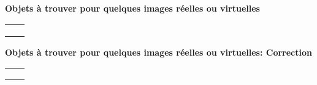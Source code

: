 \documentclass{article}
\newcommand{\titre}[1]{
\begin{center}
  {\Large\textbf{#1}}
\end{center}

}
\begin{document}
\titre{Objets \`a trouver pour quelques images r\'eelles ou virtuelles}
\begin{tabular}{|c|c|}
\hline
&\\ \hline
&\\ \hline
&\\ \hline
&\\ \hline
\end{tabular}


\newpage


\titre{Objets \`a trouver pour quelques images r\'eelles ou virtuelles: Correction}
\begin{tabular}{|c|c|}
\hline
&\\ \hline
&\\ \hline
&\\ \hline
&\\ \hline
\end{tabular}


\newpage
\end{document}
